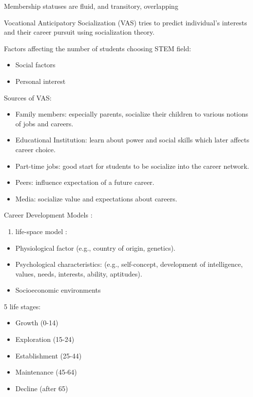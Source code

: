 \documentclass[
]{book}
\providecommand{\tightlist}{%
  \setlength{\itemsep}{0pt}\setlength{\parskip}{0pt}}
\begin{document}
Membership statuses are fluid, and transitory, overlapping

\citep{Myers_2010}

Vocational Anticipatory Socialization (VAS) tries to predict individual's interests and their career pursuit using
socialization theory.

Factors affecting the number of students choosing STEM field:

\begin{itemize}
\tightlist
\item
  Social factors
\item
  Personal interest
\end{itemize}

Sources of VAS:

\begin{itemize}
\tightlist
\item
  Family members: especially parents, socialize their children to various notions of jobs and careers.
\item
  Educational Institution: learn about power and social skills which later affects career choice.
\item
  Part-time jobs: good start for students to be socialize into the career network.
\item
  Peers: influence expectation of a future career.
\item
  Media: socialize value and expectations about careers.
\end{itemize}

Career Development Models :

\begin{enumerate}
\def\labelenumi{\arabic{enumi}.}
\tightlist
\item
  life-space model \citep{Vondracek_2019}:
\end{enumerate}

\begin{itemize}
\tightlist
\item
  Physiological factor (e.g., country of origin, genetics).
\item
  Psychological characteristics: (e.g., self-concept, development of intelligence, values, needs, interests, ability,
  aptitudes).
\item
  Socioeconomic environments
\end{itemize}

5 life stages:

\begin{itemize}
\tightlist
\item
  Growth (0-14)
\item
  Exploration (15-24)
\item
  Establishment (25-44)
\item
  Maintenance (45-64)
\item
  Decline (after 65)
\end{itemize}
\end{document}
